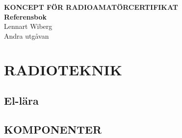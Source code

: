 \documentclass[a4paper,twoside,openright]{book}
\begin{document}
\AddToShipoutPicture*{\BackgroundPic}

\pagestyle{empty}



\onecolumn
\vspace{3cm}
\begin{center}
\Huge{\bfseries{\color{white}KONCEPT FÖR RADIO\-AMATÖRCERTIFIKAT}} \\[2ex]
\Huge{\bfseries{\color{white}Referensbok}} \\[2ex]
\huge{\color{white}Lennart Wiberg} \\
\Large{\color{white}Andra utgåvan}
\end{center}

\clearpage




\lfoot[\revision]{}
\rfoot[]{\revision}

\cleardoublepage
\pagestyle{fancy}


\tableofcontents

\setlength{\parindent}{0pt}
\setlength{\parskip}{1ex plus 0.5ex minus 0.2ex}

\mainmatter

%




\part{RADIOTEKNIK}
\chapter{El-lära}
\label{ellära}











\chapter{KOMPONENTER}
\label{komponenter}










\end{document}

